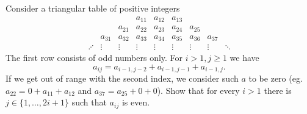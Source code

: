 Consider a triangular table of positive integers
\[
\begin{matrix}
 & & & a_{11} & a_{12} & a_{13} & & &  \\
 & & a_{21} & a_{22} & a_{23} & a_{24} & a_{25} & & \\
 & a_{31} & a_{32} & a_{33} & a_{34} & a_{35} & a_{36} & a_{37} & \\
\iddots & \vdots & \vdots & \vdots & \vdots & \vdots & \vdots & \vdots & \ddots
\end{matrix}
\]The first row consists of odd numbers only. For $i>1,j\ge1$ we have \[a_{ij}=a_{i-1,j-2}+a_{i-1,j-1}+a_{i-1,j}.\]If we get out of range with the second index, we consider such $a$ to be zero (eg. $a_{22}=0+a_{11}+a_{12}$ and $a_{37}=a_{25}+0+0$). Show that for every $i>1$ there is $j\in\{1,\ldots,2i+1\}$ such that $a_{ij}$ is even.